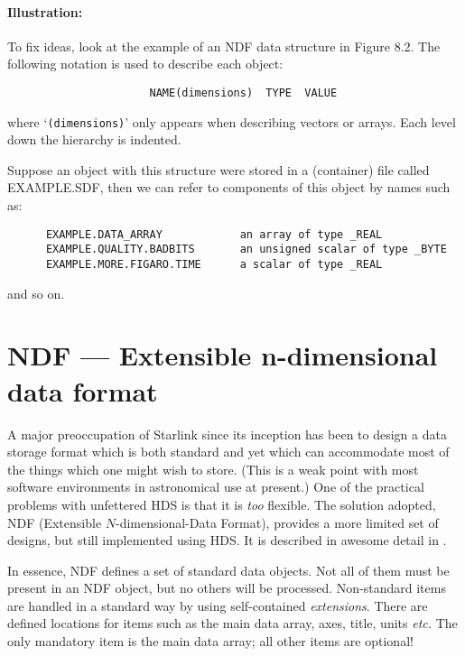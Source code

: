 \paragraph{Illustration:}\hfill

To fix ideas, look at the example of an NDF data structure in Figure 8.2.
The following notation is used to describe each object:

\begin{small}
\begin{verbatim}
                      NAME(dimensions)  TYPE  VALUE
\end{verbatim}
\end{small}

where `\verb+(dimensions)+' only appears when describing vectors or arrays.
Each level down the hierarchy is indented.

Suppose an object with this structure were stored in a (container) file called
EXAMPLE.SDF, then we can refer to components of this object by names such as:

\begin{small}
\begin{verbatim}
      EXAMPLE.DATA_ARRAY            an array of type _REAL
      EXAMPLE.QUALITY.BADBITS       an unsigned scalar of type _BYTE
      EXAMPLE.MORE.FIGARO.TIME      a scalar of type _REAL
\end{verbatim}
\end{small}

and so on.

\section {NDF --- Extensible n-dimensional data format}
\label{S_NDF}

A major preoccupation of Starlink since its inception has been to design a data
storage format which is both standard and yet which can accommodate most of
the things which one might wish to store.
(This is a weak point with most software environments in astronomical use at
present.)
One of the practical problems with unfettered HDS is that it is {\em too\/}
flexible.
The solution adopted, NDF (Extensible $N$-dimensional-Data Format), provides
a more limited set of designs, but still implemented using HDS.
It is described in awesome detail in .

In essence, NDF defines a set of standard data objects.
Not all of them must be present in an NDF object, but no others will be
processed.
Non-standard items are handled in a standard way by using self-contained
{\em extensions}.
There are defined locations for items such as the main data array, axes, title,
units {\em etc.} 
The only mandatory item is the main data array; all other items are optional! 


